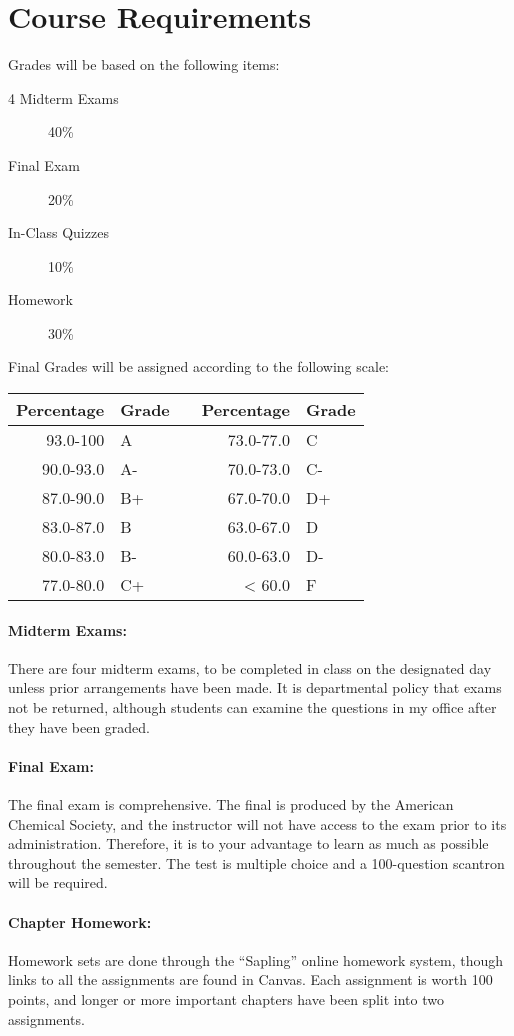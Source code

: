 \documentclass[12pt, letterpaper]{article}
\begin{document}
\section*{Course Requirements}
Grades will be based on the following items:
\begin{description}
  \item[4 Midterm Exams] 40\%
  \item[Final Exam] 20\%
  \item[In-Class Quizzes] 10\%
  \item[Homework] 30\%
\end{description}
Final Grades will be assigned according to the following scale:

\begin{tabular}{rl|c|rl}
	Percentage & Grade &  & Percentage & Grade \\ \midrule
	  93.0-100 & A     &  &  73.0-77.0 & C     \\
	 90.0-93.0 & A-    &  &  70.0-73.0 & C-    \\
	 87.0-90.0 & B+    &  &  67.0-70.0 & D+    \\
	 83.0-87.0 & B     &  &  63.0-67.0 & D     \\
	 80.0-83.0 & B-    &  &  60.0-63.0 & D-    \\
	 77.0-80.0 & C+    &  &     < 60.0 & F
\end{tabular}
\paragraph{Midterm Exams:}
There are four midterm exams, to be completed in class on the designated day unless prior arrangements have been made. It is departmental policy that exams not be returned, although students can examine the questions in my office after they have been graded.

\paragraph{Final Exam:}
The final exam is comprehensive. The final is produced by the American Chemical Society, and the instructor will not have access to the exam prior to its administration. Therefore, it is to your advantage to learn as much as possible throughout the semester. The test is multiple choice and a 100-question scantron will be required.

\paragraph{Chapter Homework:}
Homework sets are done through the ``Sapling'' online homework system, though links to all the assignments are found in Canvas. Each assignment is worth 100 points, and longer or more important chapters have been split into two assignments.
\end{document}
